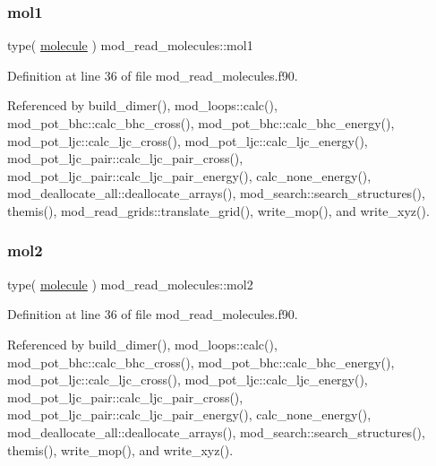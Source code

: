 \subsubsection{\texorpdfstring{mol1}{mol1}}
{\footnotesize\ttfamily type( \hyperlink{structmod__read__molecules_1_1molecule}{molecule} ) mod\+\_\+read\+\_\+molecules\+::mol1}



Definition at line 36 of file mod\+\_\+read\+\_\+molecules.\+f90.



Referenced by build\+\_\+dimer(), mod\+\_\+loops\+::calc(), mod\+\_\+pot\+\_\+bhc\+::calc\+\_\+bhc\+\_\+cross(), mod\+\_\+pot\+\_\+bhc\+::calc\+\_\+bhc\+\_\+energy(), mod\+\_\+pot\+\_\+ljc\+::calc\+\_\+ljc\+\_\+cross(), mod\+\_\+pot\+\_\+ljc\+::calc\+\_\+ljc\+\_\+energy(), mod\+\_\+pot\+\_\+ljc\+\_\+pair\+::calc\+\_\+ljc\+\_\+pair\+\_\+cross(), mod\+\_\+pot\+\_\+ljc\+\_\+pair\+::calc\+\_\+ljc\+\_\+pair\+\_\+energy(), calc\+\_\+none\+\_\+energy(), mod\+\_\+deallocate\+\_\+all\+::deallocate\+\_\+arrays(), mod\+\_\+search\+::search\+\_\+structures(), themis(), mod\+\_\+read\+\_\+grids\+::translate\+\_\+grid(), write\+\_\+mop(), and write\+\_\+xyz().

\mbox{\label{namespacemod__read__molecules_a73b2cd7c32146644cc496892645c2e68}} 
\subsubsection{\texorpdfstring{mol2}{mol2}}
{\footnotesize\ttfamily type( \hyperlink{structmod__read__molecules_1_1molecule}{molecule} ) mod\+\_\+read\+\_\+molecules\+::mol2}



Definition at line 36 of file mod\+\_\+read\+\_\+molecules.\+f90.



Referenced by build\+\_\+dimer(), mod\+\_\+loops\+::calc(), mod\+\_\+pot\+\_\+bhc\+::calc\+\_\+bhc\+\_\+cross(), mod\+\_\+pot\+\_\+bhc\+::calc\+\_\+bhc\+\_\+energy(), mod\+\_\+pot\+\_\+ljc\+::calc\+\_\+ljc\+\_\+cross(), mod\+\_\+pot\+\_\+ljc\+::calc\+\_\+ljc\+\_\+energy(), mod\+\_\+pot\+\_\+ljc\+\_\+pair\+::calc\+\_\+ljc\+\_\+pair\+\_\+cross(), mod\+\_\+pot\+\_\+ljc\+\_\+pair\+::calc\+\_\+ljc\+\_\+pair\+\_\+energy(), calc\+\_\+none\+\_\+energy(), mod\+\_\+deallocate\+\_\+all\+::deallocate\+\_\+arrays(), mod\+\_\+search\+::search\+\_\+structures(), themis(), write\+\_\+mop(), and write\+\_\+xyz().

